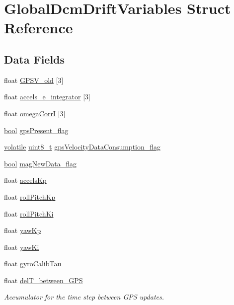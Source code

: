 \hypertarget{struct_global_dcm_drift_variables}{\section{Global\-Dcm\-Drift\-Variables Struct Reference}
\label{struct_global_dcm_drift_variables}
}
\subsection*{Data Fields}
\begin{DoxyCompactItemize}
\item 
float \hyperlink{struct_global_dcm_drift_variables_afb3e9353cbef8439a6f132ba9af70a3f}{G\-P\-S\-V\-\_\-old} \mbox{[}3\mbox{]}
\item 
float \hyperlink{struct_global_dcm_drift_variables_aacbe312b74443ac8368010f90278706e}{accels\-\_\-e\-\_\-integrator} \mbox{[}3\mbox{]}
\item 
float \hyperlink{struct_global_dcm_drift_variables_a08c07c4b4d2fbc994b2eee3f0d4772b1}{omega\-Corr\-I} \mbox{[}3\mbox{]}
\item 
\hyperlink{group___exported__types_gaf6a258d8f3ee5206d682d799316314b1}{bool} \hyperlink{struct_global_dcm_drift_variables_ac7e3400f33023d97c131553ebefc9ce8}{gps\-Present\-\_\-flag}
\item 
\hyperlink{group___c_m_s_i_s___core___instruction_interface_gad7d93af13046b0378601b85c8c16673b}{volatile} \hyperlink{stdint_8h_aba7bc1797add20fe3efdf37ced1182c5}{uint8\-\_\-t} \hyperlink{struct_global_dcm_drift_variables_a27daf6a38cb6e81c64aba4bb8ac9f3fa}{gps\-Velocity\-Data\-Consumption\-\_\-flag}
\item 
\hyperlink{group___exported__types_gaf6a258d8f3ee5206d682d799316314b1}{bool} \hyperlink{struct_global_dcm_drift_variables_a225159950d82f32b3c5fe0d4014488cf}{mag\-New\-Data\-\_\-flag}
\item 
float \hyperlink{struct_global_dcm_drift_variables_a72471dea4e93a3fa653ba73556b61990}{accels\-Kp}
\item 
float \hyperlink{struct_global_dcm_drift_variables_a99a127bcaabe2e53c45a56eb568bc020}{roll\-Pitch\-Kp}
\item 
float \hyperlink{struct_global_dcm_drift_variables_a527cbde51d73c3c3fa34e5ce3b17454a}{roll\-Pitch\-Ki}
\item 
float \hyperlink{struct_global_dcm_drift_variables_af0f020f038b168267dd7f4fab0d26178}{yaw\-Kp}
\item 
float \hyperlink{struct_global_dcm_drift_variables_a81b393df9390fedc959c476b3c7381c6}{yaw\-Ki}
\item 
float \hyperlink{struct_global_dcm_drift_variables_a3b2a14d2ee0eb630e1d8048391e1fdd4}{gyro\-Calib\-Tau}
\item 
float \hyperlink{struct_global_dcm_drift_variables_a00e780a5b38ecb97c9daccd52b0ef4cf}{del\-T\-\_\-between\-\_\-\-G\-P\-S}
\begin{DoxyCompactList}\small\item\em Accumulator for the time step between G\-P\-S updates. \end{DoxyCompactList}\end{DoxyCompactItemize}


